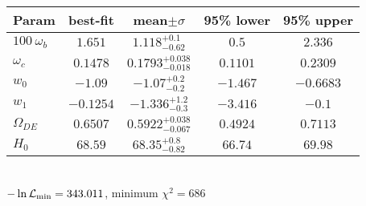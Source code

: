 \begin{tabular}{|l|c|c|c|c|} 
 \hline 
Param & best-fit & mean$\pm\sigma$ & 95\% lower & 95\% upper \\ \hline 
$100~\omega_{b }$ &$1.651$ & $1.118_{-0.62}^{+0.1}$ & $0.5$ & $2.336$ \\ 
$\omega_c$ &$0.1478$ & $0.1793_{-0.018}^{+0.038}$ & $0.1101$ & $0.2309$ \\ 
$w_{0 }$ &$-1.09$ & $-1.07_{-0.2}^{+0.2}$ & $-1.467$ & $-0.6683$ \\ 
$w_{1 }$ &$-0.1254$ & $-1.336_{-0.3}^{+1.2}$ & $-3.416$ & $-0.1$ \\ 
$\Omega_{DE}$ &$0.6507$ & $0.5922_{-0.067}^{+0.038}$ & $0.4924$ & $0.7113$ \\ 
$H_{0 }$ &$68.59$ & $68.35_{-0.82}^{+0.8}$ & $66.74$ & $69.98$ \\ 
\hline 
 \end{tabular} \\ 
$-\ln{\cal L}_\mathrm{min} =343.011$, minimum $\chi^2=686$ \\ 
